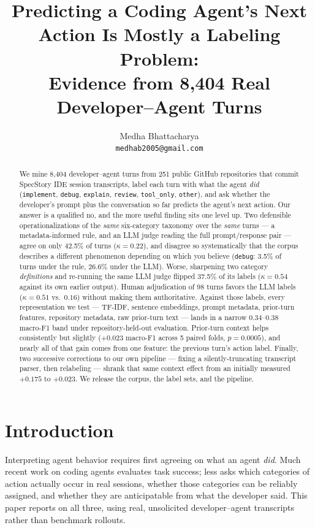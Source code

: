 \documentclass[10pt]{article}
\title{\vspace{-2em}Predicting a Coding Agent's Next Action Is Mostly a Labeling Problem:\\
Evidence from 8{,}404 Real Developer--Agent Turns}
\author{%
  Medha Bhattacharya\\
  \texttt{medhab2005@gmail.com}
}
\date{}
\begin{document}
\maketitle
\vspace{-2em}

\begin{abstract}
\noindent
We mine 8{,}404 developer--agent turns from 251 public GitHub repositories that
commit SpecStory IDE session transcripts, label each turn with what the agent
\emph{did} (\texttt{implement}, \texttt{debug}, \texttt{explain},
\texttt{review}, \texttt{tool\_only}, \texttt{other}), and ask whether the
developer's prompt plus the conversation so far predicts the agent's next action.
Our answer is a qualified no, and the more useful finding sits one level up. Two
defensible operationalizations of the \emph{same} six-category taxonomy over the
\emph{same} turns --- a metadata-informed rule, and an LLM judge reading the full
prompt/response pair --- agree on only 42.5\% of turns ($\kappa = 0.22$), and
disagree so systematically that the corpus describes a different phenomenon
depending on which you believe (\texttt{debug}: 3.5\% of turns under the rule,
26.6\% under the LLM). Worse, sharpening two category \emph{definitions} and
re-running the same LLM judge flipped 37.5\% of its labels ($\kappa = 0.54$
against its own earlier output). Human adjudication of 98 turns favors the LLM
labels ($\kappa = 0.51$ vs.\ $0.16$) without making them authoritative. Against
those labels, every representation we test --- TF-IDF, sentence embeddings,
prompt metadata, prior-turn features, repository metadata, raw prior-turn text
--- lands in a narrow 0.34--0.38 macro-F1 band under repository-held-out
evaluation. Prior-turn context helps consistently but slightly ($+0.023$
macro-F1 across 5 paired folds, $p = 0.0005$), and nearly all of that gain comes
from one feature: the previous turn's action label. Finally, two successive
corrections to our own pipeline --- fixing a silently-truncating transcript
parser, then relabeling --- shrank that same context effect from an initially
measured $+0.175$ to $+0.023$. We release the corpus, the label sets, and the
pipeline.
\end{abstract}

\section{Introduction}

Interpreting agent behavior requires first agreeing on what an agent \emph{did}.
Much recent work on coding agents evaluates task success; less asks which
categories of action actually occur in real sessions, whether those categories
can be reliably assigned, and whether they are anticipatable from what the
developer said. This paper reports on all three, using real, unsolicited
developer--agent transcripts rather than benchmark rollouts.
\end{document}
